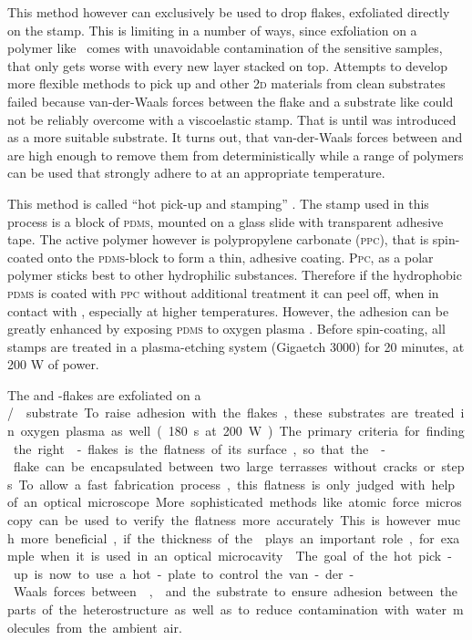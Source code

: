This method however can exclusively be used to drop \tmdg flakes, exfoliated directly on the stamp. This is limiting in a number of ways, since exfoliation on a polymer like \pdms\ comes with unavoidable contamination of the sensitive samples, that only gets worse with every new layer stacked on top. Attempts to develop more flexible methods to pick up \tmds and other 2\textsc{d} materials from clean substrates failed because van-der-Waals forces between the flake and a substrate like \sio could not be reliably overcome with a viscoelastic stamp. That is until \hbng was introduced as a more suitable substrate. It turns out, that van-der-Waals forces between \hbng and \tmds are high enough to remove them from \sio deterministically while a range of polymers can be used that strongly adhere to \hbng at an appropriate temperature.

This method is called ``hot pick-up and stamping'' \cite{pizzocchero_hot_2016, tien_study_2016}. The stamp used in this process is a block of \textsc{pdms}, mounted on a glass slide with transparent adhesive tape. The active polymer however is polypropylene carbonate (\textsc{ppc}), that is spin-coated onto the \textsc{pdms}-block to form a thin, adhesive coating. \textsc{Ppc}, as a polar polymer sticks best to other hydrophilic substances. Therefore if the hydrophobic \textsc{pdms} is coated with \textsc{ppc} without additional treatment it can peel off, when in contact with \sio\!, especially at higher temperatures. However, the adhesion can be greatly enhanced by exposing \textsc{pdms} to oxygen plasma \cite{jung_adhesion_2016}. Before spin-coating, all stamps are treated in a plasma-etching system (Gigaetch 3000) for 20 minutes, at 200 W of power.

The \tmdg and \hbn-flakes are exfoliated on a \si/\sio substrate. To raise adhesion with the flakes, these substrates are treated in oxygen plasma as well (180 s at 200 W). The primary criteria for finding the right \hbn-flakes is the flatness of its surface, so that the \tmd-flake can be encapsulated between two large terrasses without cracks or steps. To allow a fast fabrication process, this flatness is only judged with help of an optical microscope. More sophisticated methods like atomic force microscopy can be used to verify the flatness more accurately. This is however much more beneficial, if the thickness of the \hbng plays an important role, for example when it is used in an optical microcavity  \cite{sidler_fermi_2016}.

The goal of the hot pick-up is now to use a hot-plate to control the van-der-Waals forces between \hbn, \tmds and the substrate to ensure adhesion between the parts of the heterostructure as well as to reduce contamination with water molecules from the ambient air.

